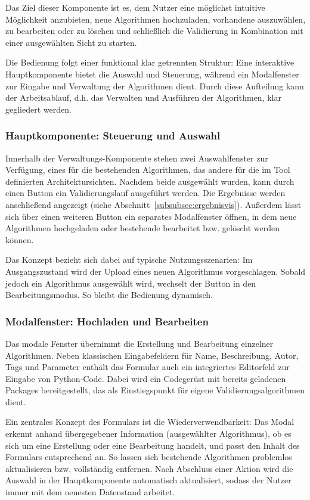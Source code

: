 Das Ziel dieser Komponente ist es, dem Nutzer eine möglichst intuitive Möglichkeit anzubieten, neue Algorithmen hochzuladen, vorhandene auszuwählen, zu bearbeiten oder zu löschen und schließlich die Validierung in Kombination mit einer ausgewählten Sicht zu starten.

Die Bedienung folgt einer funktional klar getrennten Struktur: Eine interaktive Hauptkomponente bietet die Auswahl und Steuerung, während ein Modalfenster zur Eingabe und Verwaltung der Algorithmen dient. Durch diese Aufteilung kann der Arbeitsablauf, d.h. das Verwalten und Ausführen der Algorithmen, klar gegliedert werden.

\subsubsection*{Hauptkomponente: Steuerung und Auswahl}

Innerhalb der Verwaltungs-Komponente stehen zwei Auswahlfenster zur Verfügung, eines für die bestehenden Algorithmen, das andere für die im Tool definierten Architektursichten. Nachdem beide ausgewählt wurden, kann durch einen Button ein Validierungslauf ausgeführt werden. Die Ergebnisse werden anschließend angezeigt (siehe Abschnitt~\ref{subsubsec:ergebnisvis}). Außerdem lässt sich über einen weiteren Button ein separates Modalfenster öffnen, in dem neue Algorithmen hochgeladen oder bestehende bearbeitet bzw. gelöscht werden können.

Das Konzept bezieht sich dabei auf typische Nutzungsszenarien: Im Ausgangszustand wird der Upload eines neuen Algorithmus vorgeschlagen. Sobald jedoch ein Algorithmus ausgewählt wird, wechselt der Button in den Bearbeitungsmodus. So bleibt die Bedienung dynamisch.

\subsubsection*{Modalfenster: Hochladen und Bearbeiten}

Das modale Fenster übernimmt die Erstellung und Bearbeitung einzelner Algorithmen. Neben klassischen Eingabefeldern für Name, Beschreibung, Autor, Tags und Parameter enthält das Formular auch ein integriertes Editorfeld zur Eingabe von Python-Code. Dabei wird ein Codegerüst mit bereits geladenen Packages bereitgestellt, das als Einstiegspunkt für eigene Validierungsalgorithmen dient.

Ein zentrales Konzept des Formulars ist die Wiederverwendbarkeit: Das Modal erkennt anhand übergegebener Information (ausgewählter Algorithmus), ob es sich um eine Erstellung oder eine Bearbeitung handelt, und passt den Inhalt des Formulars entsprechend an. So lassen sich bestehende Algorithmen problemlos aktualisieren bzw. vollständig entfernen. Nach Abschluss einer Aktion wird die Auswahl in der Hauptkomponente automatisch aktualisiert, sodass der Nutzer immer mit dem neuesten Datenstand arbeitet.

